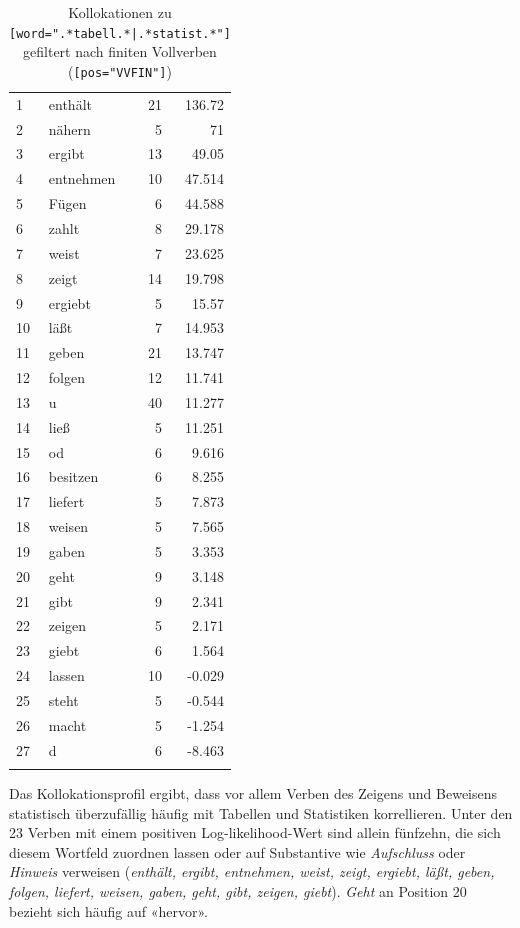 \begin{longtable}{llrr}
    1 & enthält & 21 & 136.72 \\ 
    2 & nähern & 5 & 71 \\ 
    3 & ergibt & 13 & 49.05 \\ 
    4 & entnehmen & 10 & 47.514 \\ 
    5 & Fügen & 6 & 44.588 \\ 
    6 & zahlt & 8 & 29.178 \\ 
    7 & weist & 7 & 23.625 \\ 
    8 & zeigt & 14 & 19.798 \\ 
    9 & ergiebt & 5 & 15.57 \\ 
    10 & läßt & 7 & 14.953 \\ 
    11 & geben & 21 & 13.747 \\ 
    12 & folgen & 12 & 11.741 \\ 
    13 & u & 40 & 11.277 \\ 
    14 & ließ & 5 & 11.251 \\ 
    15 & od & 6 & 9.616 \\ 
    16 & besitzen & 6 & 8.255 \\ 
    17 & liefert & 5 & 7.873 \\ 
    18 & weisen & 5 & 7.565 \\ 
    19 & gaben & 5 & 3.353 \\ 
    20 & geht & 9 & 3.148 \\ 
    21 & gibt & 9 & 2.341 \\ 
    22 & zeigen & 5 & 2.171 \\ 
    23 & giebt & 6 & 1.564 \\ 
    24 & lassen & 10 & -0.029 \\ 
    25 & steht & 5 & -0.544 \\ 
    26 & macht & 5 & -1.254 \\ 
    27 & d & 6 & -8.463 \\ 
            \bottomrule
        \caption{Kollokationen zu \texttt{[word=".*ta\-bell.*|\-.*sta\-tist.*"]} gefiltert nach finiten Vollverben (\texttt{[pos="VVFIN"]})}
       \label{table:5-1}
    \end{longtable}

Das Kollokationsprofil ergibt, dass vor allem Verben des Zeigens und Beweisens statistisch überzufällig häufig mit Tabellen und Statistiken korrellieren. Unter den 23 Verben mit einem positiven Log-likelihood-Wert sind allein fünfzehn, die sich diesem Wortfeld zuordnen lassen oder auf Substantive wie \textit{Aufschluss} oder \textit{Hinweis} verweisen (\textit{enthält, ergibt, entnehmen, weist, zeigt, ergiebt, läßt, geben, folgen, liefert, weisen, gaben, geht, gibt, zeigen, giebt}). \textit{Geht} an Position 20 bezieht sich häufig auf «hervor».

